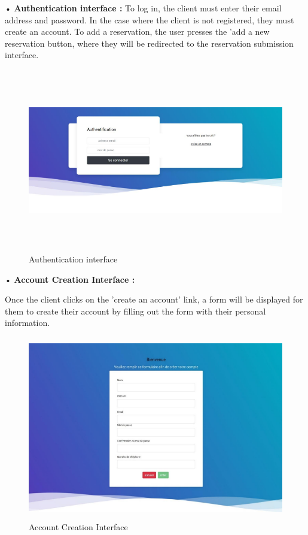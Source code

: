 •\textbf{ Authentication interface  :}
To log in, the client must enter their email address and password. In the case where the client is not registered, they must create an account. To add a reservation, the user presses the 'add a new reservation button, where they will be redirected to the reservation submission interface. 
 \begin{figure}[H]
   \centering
    \includegraphics[width=15cm,height=8cm]{images/autint.png}
    \caption{Authentication interface } 
    \label{Authentication interface }
\end{figure}

•\textbf{ Account Creation Interface   :}

Once the client clicks on the 'create an account' link, a form will be displayed for them to create their account by filling out the form with their personal information. 
 \begin{figure}[H]
   \centering
    \includegraphics[width=15cm,height=8cm]{images/inscit.png}
    \caption{Account Creation Interface } 
    \label{Account Creation Interface }
\end{figure}


